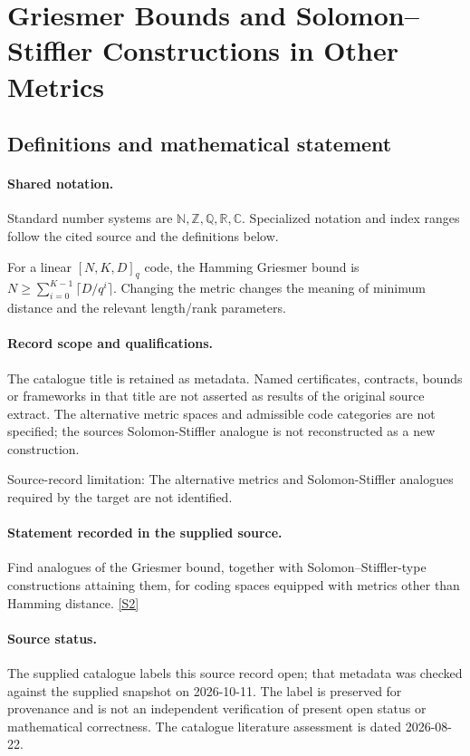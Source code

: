 \documentclass[11pt]{article}
\newcommand{\sref}[2]{\hyperlink{source:#1:#2}{[S#2]}}
\begin{document}
\section{Griesmer Bounds and Solomon–Stiffler Constructions in Other Metrics}\label{statement}

\subsection{Definitions and mathematical statement}

\paragraph{Shared notation.}Standard number systems are $\mathbb N,\mathbb Z,\mathbb Q,\mathbb R,\mathbb C$. Specialized notation and index ranges follow the cited source and the definitions below.


For a linear $[N,K,D]_q$ code, the Hamming Griesmer bound is $N\geq\sum_{i=0}^{K-1}\lceil D/q^i\rceil$. Changing the metric changes the meaning of minimum distance and the relevant length/rank parameters.
\paragraph{Record scope and qualifications.}
The catalogue title is retained as metadata. Named certificates, contracts, bounds or frameworks in that title are not asserted as results of the original source extract.
The alternative metric spaces and admissible code categories are not specified; the source\textquotesingle s Solomon-Stiffler analogue is not reconstructed as a new construction.

Source-record limitation: The alternative metrics and Solomon-Stiffler analogues required by the target are not identified.
\paragraph{Statement recorded in the supplied source.}
Find analogues of the Griesmer bound, together with Solomon–Stiffler-type constructions attaining them, for coding spaces equipped with metrics other than Hamming distance. \sref{statement}{2}
\paragraph{Source status.}
The supplied catalogue labels this source record open; that metadata was checked against the supplied snapshot on 2026-10-11. The label is preserved for provenance and is not an independent verification of present open status or mathematical correctness. The catalogue literature assessment is dated 2026-08-22.
\end{document}
